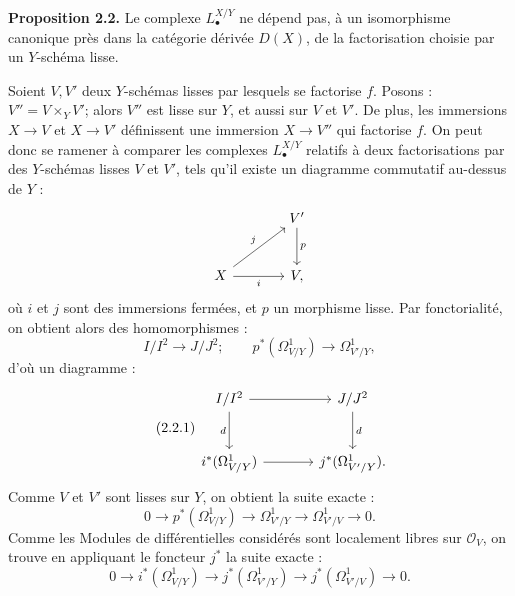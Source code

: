 \textbf{Proposition 2.2.} Le complexe $L^{X/Y}_\bullet$ ne dépend pas, à un isomorphisme canonique près dans la catégorie dérivée $D(X)$, de la factorisation choisie par un $Y$-schéma lisse.

Soient $V,V'$ deux $Y$-schémas lisses par lesquels se factorise $f$. Posons : $V''=V\times_Y V'$; alors $V''$ est lisse sur $Y$, et aussi sur $V$ et $V'$. De plus, les immersions $X\to V$ et $X\to V'$ définissent une immersion $X\to V''$ qui factorise $f$. On peut donc se ramener à comparer les complexes $L^{X/Y}_\bullet$ relatifs à deux factorisations par des $Y$-schémas lisses $V$ et $V'$, tels qu'il existe un diagramme commutatif au-dessus de $Y$ :
\[
\begin{tikzcd}[column sep=large,row sep=large]
& V' \arrow[d,"p"]\\
X \arrow[ur,"j"] \arrow[r,"i"'] & V,
\end{tikzcd}
\]
où $i$ et $j$ sont des immersions fermées, et $p$ un morphisme lisse. Par fonctorialité, on obtient alors des homomorphismes :
\[
I/I^2\longrightarrow J/J^2;
\qquad
p^*(\Omega^1_{V/Y})\longrightarrow\Omega^1_{V'/Y},
\]
d'où un diagramme :
\begin{equation}\tag{2.2.1}
\begin{tikzcd}[column sep=large,row sep=large]
I/I^2 \arrow[r] \arrow[d,"d"'] & J/J^2 \arrow[d,"d"]\\
i^*(\Omega^1_{V/Y}) \arrow[r] & j^*(\Omega^1_{V'/Y}).
\end{tikzcd}
\end{equation}
Comme $V$ et $V'$ sont lisses sur $Y$, on obtient la suite exacte :
\[
0\longrightarrow p^*(\Omega^1_{V/Y})\longrightarrow\Omega^1_{V'/Y}
\longrightarrow\Omega^1_{V'/V}\longrightarrow0.
\]
Comme les Modules de différentielles considérés sont localement libres sur $\mathcal O_V$, on trouve en appliquant le foncteur $j^*$ la suite exacte :
\begin{equation}\tag{2.2.2}
0\longrightarrow i^*(\Omega^1_{V/Y})\longrightarrow j^*(\Omega^1_{V'/Y})
\longrightarrow j^*(\Omega^1_{V'/V})\longrightarrow0.
\end{equation}
